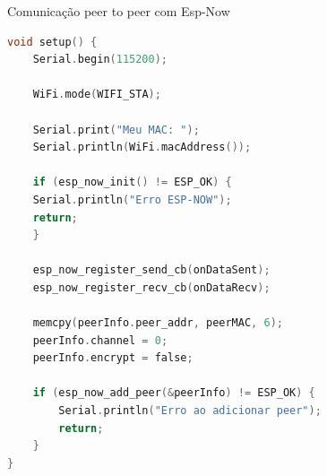 \begin{frame}[fragile]{Comunicação peer to peer com Esp-Now}
\begin{lstlisting}[language=C, basicstyle=\tiny\ttfamily]    
void setup() {
    Serial.begin(115200);

    WiFi.mode(WIFI_STA);

    Serial.print("Meu MAC: ");
    Serial.println(WiFi.macAddress());

    if (esp_now_init() != ESP_OK) {
    Serial.println("Erro ESP-NOW");
    return;
    }

    esp_now_register_send_cb(onDataSent);
    esp_now_register_recv_cb(onDataRecv);

    memcpy(peerInfo.peer_addr, peerMAC, 6);
    peerInfo.channel = 0;
    peerInfo.encrypt = false;

    if (esp_now_add_peer(&peerInfo) != ESP_OK) {
        Serial.println("Erro ao adicionar peer");
        return;
    }
}
\end{lstlisting}
\end{frame}
            
                